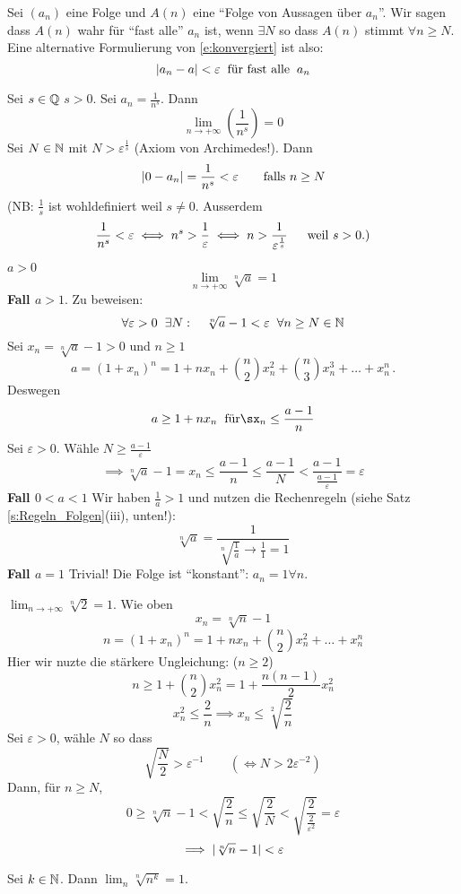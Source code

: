 \begin{Def}
  Sei $(a_n)$ eine Folge und $A(n)$ eine ``Folge von Aussagen über $a_n$''. 
Wir sagen dass $A(n)$ wahr für ``fast alle'' $a_n$ ist, wenn $\exists N$ so dass $A(n)$ 
stimmt $\forall n\geq N$. Eine alternative Formulierung von \eqref{e:konvergiert} ist also:
  \[\mathopen| a_n-a \mathclose|<\varepsilon\hspace{2mm}\text{f\"ur fast alle}\hspace{2mm} a_n\]
\end{Def}
\begin{Bsp}
  Sei $s\in\mathbb{Q}$ $s>0$. Sei $a_n=\frac{1}{n^s}$. Dann
  \[\lim_{n\to+\infty}\left( \frac{1}{n^s} \right)=0\]
  Sei $N\in \mathbb{N}$ mit $N>\varepsilon^{\frac{1}{s}}$ (Axiom von Archimedes!). Dann
  \[\mathopen| 0-a_n \mathclose|=\frac{1}{n^s}<\varepsilon\qquad \mbox{falls $n\geq N$}\]
(NB: $\frac{1}{s}$ ist wohldefiniert weil $s\neq 0$. Ausserdem
\[\frac{1}{n^s}<\varepsilon \iff n^s>\frac{1}{\varepsilon}\iff n>
\frac{1}{\varepsilon^{\frac{1}{s}}}\quad\hspace{2mm}\text{weil $s> 0$.)}\]
\end{Bsp}
\begin{Bsp}
  $a>0$
  \[\lim_{n\to+\infty}\sqrt[n]{a}=1\]
  {\bf Fall $a>1$}. Zu beweisen:
  \[\forall \varepsilon>0 \hspace{2mm}\exists N:\quad \sqrt[n]{a}-1<\varepsilon\hspace{2mm}\forall n\geq N\in\mathbb{N}\]
  Sei $x_n=\sqrt[n]{a}-1>0$ und $n\geq 1$
  \[a=(1+x_n)^n=1+nx_n+\binom{n}{2}x^2_n+\binom{n}{3}x_n^3+\dots+x_n^n\, .\]
  Deswegen\[a\geq 1+nx_n\s\text{für}\sx_n\leq\frac{a-1}{n}\]
  Sei $\varepsilon>0$. Wähle $N\geq \frac{a-1}{\varepsilon}$
  \[\implies\sqrt[n]{a}-1=x_n\leq\frac{a-1}{n}\leq\frac{a-1}{N}<\frac{a-1}{\frac{a-1}{\varepsilon}}=
  \varepsilon\]
  {\bf Fall $0<a<1$} Wir haben $\frac{1}{a}>1$ und nutzen die Rechenregeln (siehe Satz 
\ref{s:Regeln_Folgen}(iii), unten!):
\[\sqrt[n]{a}=\frac{1}{\sqrt[n]{\frac{1}{a}} \to \frac{1}{1} = 1}\]
 {\bf Fall $a=1$} Trivial! Die Folge ist ``konstant'': $a_n=1 \forall n$.
\end{Bsp}
\begin{Bsp}
  $\lim_{n\to+\infty}\sqrt[n]{2} =1$. Wie oben
  \[x_n=\sqrt[n]{n}-1\]
  \[n=(1+x_n)^n=1+nx_n+\binom{n}{2}x_n^2+\dots+x_n^n\]
Hier wir nuzte die st\"arkere Ungleichung: ($n\geq 2$)
\[n\geq1+\binom{n}{2} x_n^2=1+\frac{n(n-1)}{2}x_n^2 \]
\[x_n^2\leq\frac{2}{n}\implies x_n\leq \sqrt[2]{\frac{2}{n}}\]
Sei $\varepsilon>0$, wähle $N$ so dass
  \[\sqrt{\frac{N}{2}}>\varepsilon^{-1}\qquad (\iff N> 2\varepsilon^{-2})\]
Dann, f\"ur $n\geq N$,
  \[0\geq\sqrt[n]{n}-1<\sqrt{\frac{2}{n}}\leq\sqrt{\frac{2}{N}}<\sqrt{\frac{2}{\frac{2}{\varepsilon^2}}}=\varepsilon\]
  \[\implies \mathopen| \sqrt[n]{n}-1 \mathclose|<\varepsilon\]
\end{Bsp}
\begin{Ueb} Sei $k\in \mathbb{N}$. Dann $\lim_n \sqrt[n]{n^k} =1$.
\end{Ueb}
